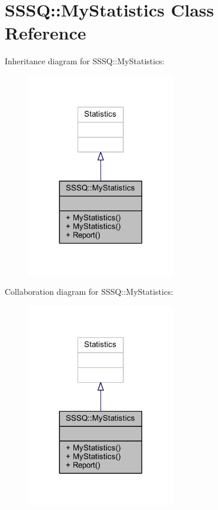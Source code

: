 \hypertarget{class_s_s_s_q_1_1_my_statistics}{}\section{S\+S\+SQ\+:\+:My\+Statistics Class Reference}
\label{class_s_s_s_q_1_1_my_statistics}


Inheritance diagram for S\+S\+SQ\+:\+:My\+Statistics\+:\nopagebreak
\begin{figure}[H]
\begin{center}
\leavevmode
\includegraphics[width=185pt]{class_s_s_s_q_1_1_my_statistics__inherit__graph}
\end{center}
\end{figure}


Collaboration diagram for S\+S\+SQ\+:\+:My\+Statistics\+:\nopagebreak
\begin{figure}[H]
\begin{center}
\leavevmode
\includegraphics[width=185pt]{class_s_s_s_q_1_1_my_statistics__coll__graph}
\end{center}
\end{figure}

